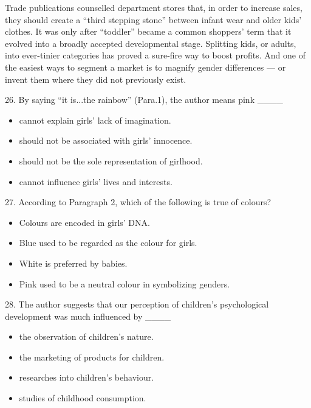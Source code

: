 \documentclass[UTF8,11pt]{ctexart}
\begin{document}
Trade publications counselled department stores that, in order to increase sales, they should create a “third stepping stone” between infant wear and older kids’ clothes. It was only after “toddler” became a common shoppers’ term that it evolved into a broadly accepted developmental stage. Splitting kids, or adults, into ever-tinier categories has proved a sure-fire way to boost profits. And one of the easiest ways to segment a market is to magnify gender differences — or invent them where they did not previously exist.


26. By saying “it is...the rainbow” (Para.1), the author means pink \_\_\_\_


\begin{itemize}[leftmargin=2em,itemsep=.2em,topsep=.4em]\item[A.] cannot explain girls’ lack of imagination.
\item[B.] should not be associated with girls’ innocence.
\item[C.] should not be the sole representation of girlhood.
\item[D.] cannot influence girls’ lives and interests.
\end{itemize}

27. According to Paragraph 2, which of the following is true of colours?


\begin{itemize}[leftmargin=2em,itemsep=.2em,topsep=.4em]\item[A.] Colours are encoded in girls’ DNA.
\item[B.] Blue used to be regarded as the colour for girls.
\item[C.] White is preferred by babies.
\item[D.] Pink used to be a neutral colour in symbolizing genders.
\end{itemize}

28. The author suggests that our perception of children’s psychological development was much influenced by \_\_\_\_


\begin{itemize}[leftmargin=2em,itemsep=.2em,topsep=.4em]\item[A.] the observation of children’s nature.
\item[B.] the marketing of products for children.
\item[C.] researches into children’s behaviour.
\item[D.] studies of childhood consumption.
\end{itemize}
\end{document}

